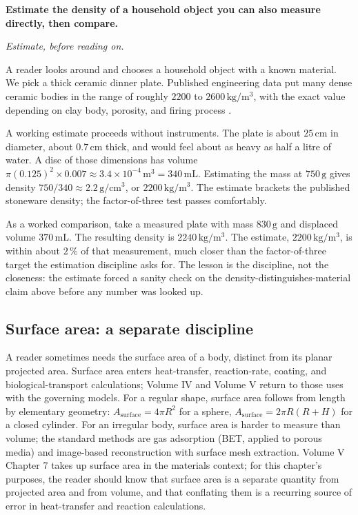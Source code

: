 \begin{estimation}
\textbf{Estimate the density of a household object you can also
measure directly, then compare.}

\smallskip
\textit{Estimate, before reading on.}

\smallskip
A reader looks around and chooses a household object with a known
material. We pick a thick ceramic dinner plate. Published
engineering data put many dense ceramic bodies in the range of
roughly $2200$ to $2600 \,\si{\kilogram\per\meter\cubed}$, with the
exact value depending on clay body, porosity, and firing process
\cite{text:ashby2017}.

A working estimate proceeds without instruments. The plate is about
$25 \,\si{\centi\meter}$ in diameter, about $0.7 \,\si{\centi\meter}$
thick, and would feel about as heavy as half a litre of water. A disc
of those dimensions has volume $\pi (0.125)^{2} \times 0.007 \approx
3.4 \times 10^{-4} \,\si{\meter\cubed} = 340 \,\si{\milli\liter}$.
Estimating the mass at $750 \,\si{\gram}$ gives density
$750 / 340 \approx 2.2 \,\si{\gram\per\centi\meter\cubed}$, or
$2200 \,\si{\kilogram\per\meter\cubed}$. The estimate brackets the
published stoneware density; the factor-of-three test passes
comfortably.

As a worked comparison, take a measured plate with mass $830 \,\si
{\gram}$ and displaced volume $370 \,\si{\milli\liter}$. The
resulting density is $2240 \,\si{\kilogram\per\meter\cubed}$. The
estimate, $2200 \,\si{\kilogram\per\meter\cubed}$, is within about
$2\,\%$ of that measurement, much closer than the factor-of-three
target the estimation discipline asks for. The lesson is the
discipline, not the closeness: the estimate forced a sanity check
on the density-distinguishes-material claim above before any number
was looked up.
\end{estimation}

\subsection{Surface area: a separate discipline}

A reader sometimes needs the surface area of a body, distinct from
its planar projected area. Surface area enters heat-transfer,
reaction-rate, coating, and biological-transport calculations;
Volume IV and Volume V return to those uses with the governing
models. For a regular shape, surface area follows from
length by elementary geometry: $A_{\text{surface}} = 4\pi R^{2}$ for
a sphere, $A_{\text{surface}} = 2\pi R(R + H)$ for a closed cylinder.
For an irregular body, surface area is harder to measure than
volume; the standard methods are gas adsorption (BET, applied to
porous media) and image-based reconstruction with surface mesh
extraction. Volume V Chapter 7 takes up surface area in the materials
context; for this chapter's purposes, the reader should know that
surface area is a separate quantity from projected area and from
volume, and that conflating them is a recurring source of error in
heat-transfer and reaction calculations.

